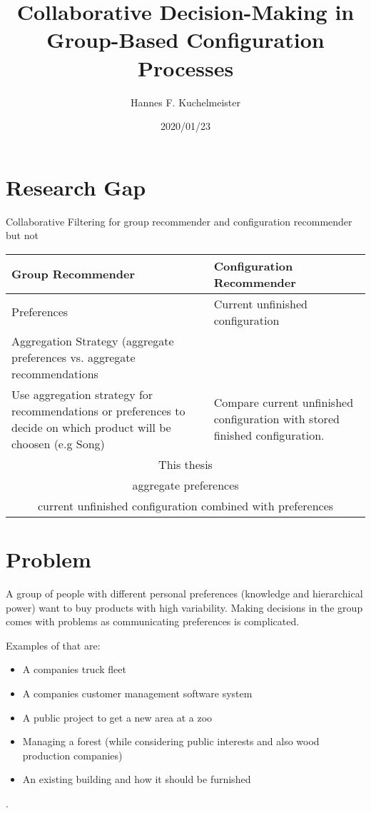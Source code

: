 \documentclass{article}
\begin{document}
\title{Collaborative Decision-Making in Group-Based Configuration Processes}
\author{Hannes F. Kuchelmeister}
\date{2020/01/23}

\maketitle

\section{Research Gap}

Collaborative Filtering for group recommender and configuration recommender but not 

\begin{center}
    \begin{tabular}{ p{5cm}|p{5cm} } 
        \hline
        Group Recommender & Configuration Recommender \\
        \hline
        Preferences & Current unfinished configuration \\ 
        Aggregation Strategy (aggregate preferences vs. aggregate recommendations &  \\
        Use aggregation strategy for recommendations or preferences to decide on which product will be choosen (e.g Song) & Compare current unfinished configuration with stored finished configuration. \\
        \hline
        \multicolumn{2}{c}{This thesis} \\
        \hline
        \multicolumn{2}{c}{aggregate preferences} \\
        \multicolumn{2}{c}{current unfinished configuration combined with preferences} \\
    \end{tabular}
\end{center}

\section{Problem}
A group of people with different personal preferences (knowledge and hierarchical power) want to buy products with high variability. Making decisions in the group comes with problems as communicating preferences is complicated.

Examples of that are:
\begin{itemize}
    \item A companies truck fleet
    \item A companies customer management software system
    \item A public project to get a new area at a zoo
    \item Managing a forest (while considering public interests and also wood production companies)
    \item An existing building and how it should be furnished
\end{itemize}. 
\end{document}
